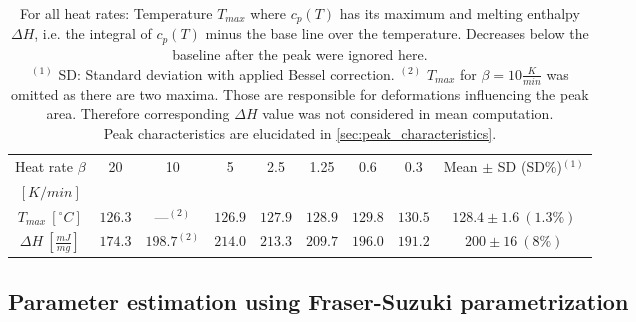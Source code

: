 \documentclass{scrartcl}[12pt, halfparskip]
\numberwithin{equation}{section}
\numberwithin{figure}{section}
\numberwithin{table}{section}
\begin{document}
\begin{table}[H]
	\centering
	\caption{For all heat rates: Temperature $T_{max}$ where $c_p(T)$ has its maximum and melting enthalpy $\Delta H$, i.e. the integral of $c_p(T)$ minus the base line over the temperature. Decreases below the baseline after the peak were ignored here. \\
		$^{(1)}$ SD: Standard deviation with applied Bessel correction. 
		$^{(2)}$ $T_{max}$ for $\beta=10\frac{K}{min}$ was omitted as there are two maxima. Those are responsible for deformations influencing the peak area. Therefore corresponding $\Delta H$ value was not considered in mean computation. \\
		Peak characteristics are elucidated in \cref{sec:peak_characteristics}.}
	\begin{tabular}{| c | c | c | c | c | c | c | c || c |} \hline
		Heat rate $\beta$ & 20 & 10 & 5 & 2.5 & 1.25 & 0.6 & 0.3 & Mean $\pm$ SD (SD\%)$^{(1)}$ \\
		$[K/min]$ & & & & & & & & \\ \hline
		$T_{max} \ [^{\circ}C]$ & $126.3$ & ---$^{(2)}$ & $126.9$ & $127.9$ & $128.9$ & $129.8$ & $130.5$ & $128.4 \pm 1.6 \ (1.3\%)$ \\[0.7ex]
		$\Delta H \ [\frac{mJ}{mg}]$ & $174.3$ & $198.7^{(2)}$ & $214.0$ & $213.3$ & $209.7$ & $196.0$ & $191.2$ & $200 \pm 16 \ (8\%)$ \\ \hline
	\end{tabular}
	\label{tab:eval_table_Tmax_deltaH_5Gaussians}
\end{table}


\subsection{Parameter estimation using Fraser-Suzuki parametrization}
\label{sec:param_estimation_fs}
\end{document}
